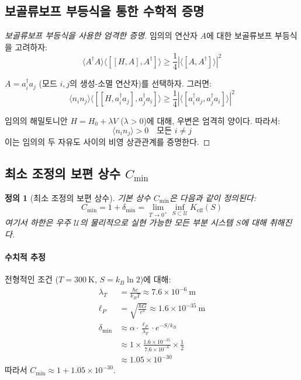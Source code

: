 \documentclass[11pt,a4paper]{article}
\newtheorem{definition}{정의}
\begin{document}
\subsection{보골류보프 부등식을 통한 수학적 증명}

\begin{proof}[보골류보프 부등식을 사용한 엄격한 증명]
	임의의 연산자 $A$에 대한 보골류보프 부등식을 고려하자:
	\begin{equation}
		\langle A^\dagger A \rangle \langle [[H, A], A^\dagger] \rangle \geq \frac{1}{4} |\langle [A, A^\dagger] \rangle|^2
	\end{equation}
	
	$A = a_i^\dagger a_j$ (모드 $i,j$의 생성-소멸 연산자)를 선택하자. 그러면:
	\begin{equation}
		\langle n_i n_j \rangle \langle [[H, a_i^\dagger a_j], a_j^\dagger a_i] \rangle \geq \frac{1}{4} |\langle [a_i^\dagger a_j, a_j^\dagger a_i] \rangle|^2
	\end{equation}
	
	임의의 해밀토니안 $H = H_0 + \lambda V$ ($\lambda > 0$)에 대해, 우변은 엄격히 양이다. 따라서:
	\begin{equation}
		\langle n_i n_j \rangle > 0 \quad \text{모든 } i \neq j
	\end{equation}
	이는 임의의 두 자유도 사이의 비영 상관관계를 증명한다.
\end{proof}

\subsection{최소 조정의 보편 상수 $C_{\min}$}

\begin{definition}[최소 조정의 보편 상수]
	기본 상수 $C_{\min}$은 다음과 같이 정의된다:
	\begin{equation}
		C_{\min} = 1 + \delta_{\min} = \lim_{T \to 0^+} \inf_{S \subset \mathcal{U}} K_{\mathrm{eff}}(S)
	\end{equation}
	여기서 하한은 우주 $\mathcal{U}$의 물리적으로 실현 가능한 모든 부분 시스템 $S$에 대해 취해진다.
\end{definition}

\paragraph{수치적 추정}
전형적인 조건 ($T = 300\ \mathrm{K}$, $S = k_B \ln 2$)에 대해:
\begin{align}
	\lambda_T &= \frac{\hbar c}{k_B T} \approx 7.6 \times 10^{-6}\ \mathrm{m} \\
	\ell_P &= \sqrt{\frac{\hbar G}{c^3}} \approx 1.6 \times 10^{-35}\ \mathrm{m} \\
	\delta_{\min} &\approx \alpha \cdot \frac{\ell_P}{\lambda_T} \cdot e^{-S/k_B} \\
	&\approx 1 \times \frac{1.6 \times 10^{-35}}{7.6 \times 10^{-6}} \times \frac{1}{2} \\
	&\approx 1.05 \times 10^{-30}
\end{align}
따라서 $C_{\min} \approx 1 + 1.05 \times 10^{-30}$.
\end{document}
